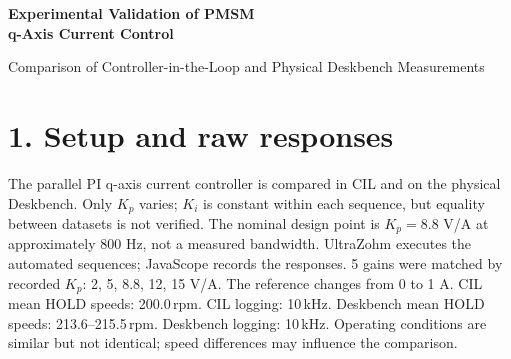 \documentclass[a4paper,11pt]{article}
\newif\ifcomparison
\begin{document}
\ifcomparison
\begin{center}
{\Large\bfseries Experimental Validation of PMSM\\q-Axis Current Control}\par
\smallskip
{\large Comparison of Controller-in-the-Loop and Physical Deskbench Measurements}
\end{center}
\section*{1. Setup and raw responses}
The parallel PI q-axis current controller is compared in CIL and on the physical
Deskbench. Only $K_p$ varies; $K_i$ is constant within each sequence, but equality
between datasets is not verified. The nominal design point is $K_p=8.8$ V/A
at approximately 800 Hz, not a measured bandwidth. UltraZohm executes the
automated sequences; JavaScope records the responses.
5 gains were matched by recorded $K_p$: 2, 5, 8.8, 12, 15 V/A. The reference changes from 0 to 1 A. CIL mean HOLD speeds: 200.0\,rpm. CIL logging: 10\,kHz. Deskbench mean HOLD speeds: 213.6--215.5\,rpm. Deskbench logging: 10\,kHz. Operating conditions are similar but not identical; speed differences may influence the comparison.
\end{document}
